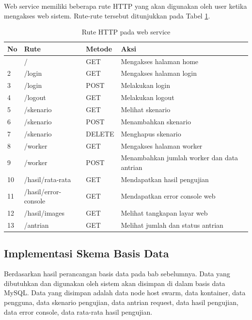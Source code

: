 			\indent Web service memiliki beberapa rute HTTP yang akan digunakan oleh user ketika mengakses web sistem. Rute-rute tersebut ditunjukkan pada Tabel \ref{tabelruteweb}.
			\begin{longtable}{|p{}|p{}|p{0.30\textwidth}|p{}|}
				\caption{Rute HTTP pada web service} \label{tabelruteweb} \\ \hline
				\textbf{No} & \textbf{Rute} & \textbf{Metode} & \textbf{Aksi} \\ \hline
				\endhead
				\endfoot
				\endlastfoot
				1 & / & GET & Mengakses halaman home \\ \hline
				2 & /login & GET & Mengakses halaman login \\ \hline
				3 & /login & POST & Melakukan login \\ \hline
				4 & /logout & GET & Melakukan logout \\ \hline
				5 & /skenario & GET & Melihat skenario \\ \hline
				6 & /skenario & POST & Menambahkan skenario \\ \hline
				7 & /skenario & DELETE & Menghapus skenario \\ \hline
				8 & /worker & GET & Mengakses halaman worker \\ \hline
				9 & /worker & POST & Menambahkan jumlah worker dan data antrian \\ \hline
				10 & /hasil/rata-rata & GET & Mendapatkan hasil pengujian \\ \hline
				11 & /hasil/error-console & GET & Mendapatkan error console web \\ \hline
				12 & /hasil/images & GET & Melihat tangkapan layar web \\ \hline
				13 & /antrian & GET & Melihat jumlah dan status antrian \\ \hline
				
			\end{longtable}
		
		\subsection{Implementasi Skema Basis Data}
			Berdasarkan hasil perancangan basis data pada bab sebelumnya. Data yang dibutuhkan dan digunakan oleh sistem akan disimpan di dalam basis data MySQL. Data yang disimpan adalah data node host swarm, data kontainer, data pengguna, data skenario pengujian, data antrian request, data hasil pengujian, data error console, data rata-rata hasil pengujian.
			
